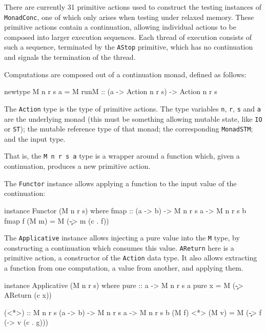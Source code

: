 There are currently 31 primitive actions used to construct the testing
instances of \verb|MonadConc|, one of which only arises when testing
under relaxed memory. These primitive actions contain a continuation,
allowing individual actions to be composed into larger execution
sequences. Each thread of execution consists of such a sequence,
terminated by the \verb|AStop| primitive, which has no continuation
and signals the termination of the thread.


Computations are composed out of a continuation monad, defined as
follows:

\begin{haskellcode}
newtype M n r s a = M { runM :: (a -> Action n r s) -> Action n r s }
\end{haskellcode}

The \verb|Action| type is the type of primitive actions. The type
variables \verb|n|, \verb|r|, \verb|s| and \verb|a| are the underlying
monad (this must be something allowing mutable state, like \verb|IO|
or \verb|ST|); the mutable reference type of that monad; the
corresponding \verb|MonadSTM|; and the input type.

That is, the \verb|M n r s a| type is a wrapper around a function
which, given a continuation, produces a new primitive action.

The \verb|Functor| instance allows applying a function to the input
value of the continuation:

\begin{haskellcode}
instance Functor (M n r s) where
  fmap :: (a -> b) -> M n r s a -> M n r s b
  fmap f (M m) = M (\c -> m (c . f))
\end{haskellcode}

The \verb|Applicative| instance allows injecting a pure value into the
\verb|M| type, by constructing a continuation which consumes this
value. \verb|AReturn| here is a primitive action, a constructor of the
\verb|Action| data type. It also allows extracting a function from one
computation, a value from another, and applying them.

\begin{haskellcode}
instance Applicative (M n r s) where
  pure :: a -> M n r s a
  pure x = M (\c -> AReturn (c x))

  (<*>) :: M n r s (a -> b) -> M n r s a -> M n r s b
  (M f) <*> (M v) = M (\c -> f (\g -> v (c . g)))
\end{haskellcode}

